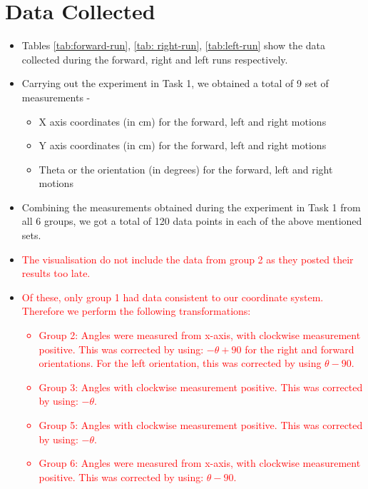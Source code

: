     
    {
    \section{Data Collected}
        \begin{itemize}
            \item Tables \ref{tab:forward-run}, \ref{tab: right-run}, \ref{tab:left-run} show the data collected during the forward, right and left runs respectively.
            \item Carrying out the experiment in Task 1, we obtained a total of 9 set of measurements -
            \begin{itemize}
                \item X axis coordinates (in cm) for the forward, left and right motions
                \item Y axis coordinates (in cm) for the forward, left and right motions
                \item Theta or the orientation (in degrees) for the forward, left and right motions
            \end{itemize}
            \item Combining the measurements obtained during the experiment in Task 1 from all 6 groups, we got a total of 120 data points in each of the above mentioned sets.
            \item \textcolor{red}{The visualisation do not include the data from group 2 as they posted their results too late.}
            \item \textcolor{red}{Of these, only group 1 had data consistent to our coordinate system. Therefore we perform the following transformations:
            \begin{itemize}
                \item Group 2: Angles were measured from x-axis, with clockwise measurement positive. This was corrected by using: $- \theta + 90$ for the right and forward orientations. For the left orientation, this was corrected by using $\theta - 90$.
                \item Group 3: Angles with clockwise measurement positive. This was corrected by using: $- \theta$.
                \item Group 5: Angles with clockwise measurement positive. This was corrected by using: $- \theta$.
                \item Group 6: Angles were measured from x-axis, with clockwise measurement positive. This was corrected by using:  $\theta - 90$.
            \end{itemize}}

\end{itemize}}
